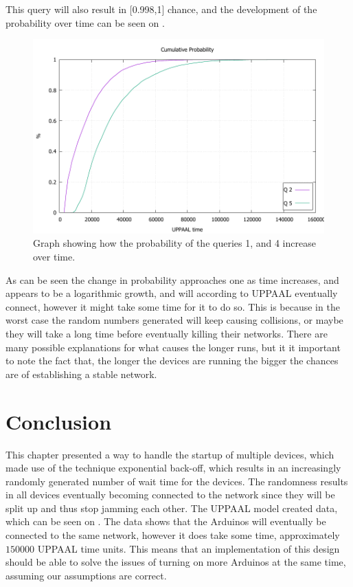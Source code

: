 \noindent This query will also result in [0.998,1] chance, and the development of the probability over time can be seen on .


\begin{figure}
  \includegraphics[width=1\textwidth]{Figures/Graphs/ConnectTime.pdf} 
\caption{Graph showing how the probability of the queries 1, and 4 increase over time.}
\label{fig:ConnectQueryTime}
\end{figure}

As can be seen the change in probability approaches one as time increases, and appears to be a logarithmic growth, and will according to UPPAAL eventually connect, however it might take some time for it to do so.
This is because in the worst case the random numbers generated will keep causing collisions, or maybe they will take a long time before eventually killing their networks.
There are many possible explanations for what causes the longer runs, but it it important to note the fact that, the longer the devices are running the bigger the chances are of establishing a stable network.


\section{Conclusion}
This chapter presented a way to handle the startup of multiple devices, which made use of the technique exponential back-off, which results in an increasingly randomly generated number of wait time for the devices. 
The randomness results in all devices eventually becoming connected to the network since they will be split up and thus stop jamming each other.
The UPPAAL model created data, which can be seen on .
The data shows that the Arduinos will eventually be connected to the same network, however it does take some time, approximately $150 000$ UPPAAL time units.
This means that an implementation of this design should be able to solve the issues of turning on more Arduinos at the same time, assuming our assumptions are correct.
